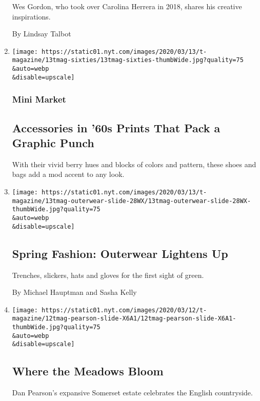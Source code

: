 \begin{enumerate}
  Wes Gordon, who took over Carolina Herrera in 2018, shares his
  creative inspirations.

  By Lindsay Talbot
\item
  \href{/2020/03/13/t-magazine/accessories-60s-prints.html}{}

  \texttt{[image: https://static01.nyt.com/images/2020/03/13/t-magazine/13tmag-sixties/13tmag-sixties-thumbWide.jpg?quality=75\\\&auto=webp\\\&disable=upscale]}

  \hypertarget{mini-market}{%
  \subsubsection{Mini Market}\label{mini-market}}

  \hypertarget{accessories-in-60s-prints-that-pack-a-graphic-punch}{%
  \subsection{Accessories in '60s Prints That Pack a Graphic
  Punch}\label{accessories-in-60s-prints-that-pack-a-graphic-punch}}

  With their vivid berry hues and blocks of colors and pattern, these
  shoes and bags add a mod accent to any look.
\item
  \href{/2020/03/13/t-magazine/spring-outerwear.html}{}

  \texttt{[image: https://static01.nyt.com/images/2020/03/13/t-magazine/13tmag-outerwear-slide-28WX/13tmag-outerwear-slide-28WX-thumbWide.jpg?quality=75\\\&auto=webp\\\&disable=upscale]}

  \hypertarget{spring-fashion-outerwear-lightens-up}{%
  \subsection{Spring Fashion: Outerwear Lightens
  Up}\label{spring-fashion-outerwear-lightens-up}}

  Trenches, slickers, hats and gloves for the first sight of green.

  By Michael Hauptman and Sasha Kelly
\item
  \href{/slideshow/2020/03/12/t-magazine/where-the-meadows-bloom.html}{}

  \texttt{[image: https://static01.nyt.com/images/2020/03/12/t-magazine/12tmag-pearson-slide-X6A1/12tmag-pearson-slide-X6A1-thumbWide.jpg?quality=75\\\&auto=webp\\\&disable=upscale]}

  \hypertarget{where-the-meadows-bloom}{%
  \subsection{Where the Meadows Bloom}\label{where-the-meadows-bloom}}

  Dan Pearson's expansive Somerset estate celebrates the English
  countryside.
\end{enumerate}

